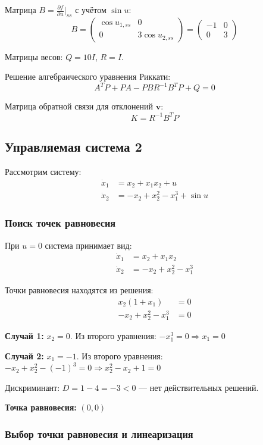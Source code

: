 Матрица $B = \frac{\partial f}{\partial u}\big|_{ss}$ с учётом $\sin u$:
$$B = \begin{pmatrix} \cos u_{1,ss} & 0 \\ 0 & 3\cos u_{2,ss} \end{pmatrix} = \begin{pmatrix} -1 & 0 \\ 0 & 3 \end{pmatrix}$$

Матрицы весов: $Q = 10I$, $R = I$.

Решение алгебраического уравнения Риккати:
$$A^T P + PA - PBR^{-1}B^T P + Q = 0$$

Матрица обратной связи для отклонений $\mathbf{v}$:
$$K = R^{-1}B^T P$$

\subsection*{Управляемая система 2}

Рассмотрим систему:
\begin{align}
\dot{x}_1 &= x_2 + x_1 x_2 + u \\
\dot{x}_2 &= -x_2 + x_2^2 - x_1^3 + \sin u
\end{align}

\subsubsection*{Поиск точек равновесия}

При $u = 0$ система принимает вид:
\begin{align}
\dot{x}_1 &= x_2 + x_1 x_2 \\
\dot{x}_2 &= -x_2 + x_2^2 - x_1^3
\end{align}

Точки равновесия находятся из решения:
\begin{align}
x_2(1 + x_1) &= 0 \\
-x_2 + x_2^2 - x_1^3 &= 0
\end{align}

\textbf{Случай 1:} $x_2 = 0$. Из второго уравнения: $-x_1^3 = 0 \Rightarrow x_1 = 0$

\textbf{Случай 2:} $x_1 = -1$. Из второго уравнения: $-x_2 + x_2^2 - (-1)^3 = 0 \Rightarrow x_2^2 - x_2 + 1 = 0$

Дискриминант: $D = 1 - 4 = -3 < 0$ --- нет действительных решений.

\textbf{Точка равновесия:} $(0, 0)$

\subsubsection*{Выбор точки равновесия и линеаризация}

